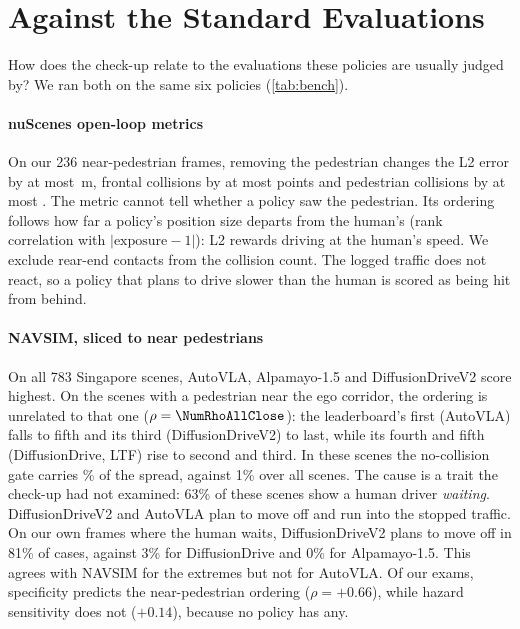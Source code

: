 \section{Against the Standard Evaluations}
\label{sec:bench}



How does the check-up relate to the evaluations these policies are usually judged by? We ran both on
the same six policies (\cref{tab:bench}).

\paragraph{nuScenes open-loop metrics}
On our 236 near-pedestrian frames, removing the pedestrian changes the L2 error by at most
\NumMaxdLtwo\,m, frontal collisions by at most \NumMaxdCol{} points and pedestrian collisions by at
most \NumMaxdPed. The metric cannot tell whether a policy saw the pedestrian. Its ordering follows how
far a policy's position size departs from the human's (rank correlation \NumRhoLtwoExp{} with
$|\text{exposure}-1|$): L2 rewards driving at the human's speed. We exclude rear-end contacts from the
collision count. The logged traffic does not react, so a policy that plans to drive slower than the
human is scored as being hit from behind.

\paragraph{NAVSIM, sliced to near pedestrians}
On all 783 Singapore scenes, AutoVLA, Alpamayo-1.5 and DiffusionDriveV2 score highest. On the
\NumNclose{} scenes with a pedestrian near the ego corridor, the ordering is unrelated to that one
($\rho=\NumRhoAllClose$): the leaderboard's first (AutoVLA) falls to fifth and its third
(DiffusionDriveV2) to last, while its fourth and fifth (DiffusionDrive, LTF) rise to second and third.
In these scenes the no-collision gate carries \NumNCshareClose\% of the spread, against 1\% over all
scenes. The cause is a trait the check-up had not examined: 63\% of these
scenes show a human driver \emph{waiting}. DiffusionDriveV2 and AutoVLA plan to move off and run into
the stopped traffic. On our own frames where the human waits, DiffusionDriveV2 plans to move off in
81\% of cases, against 3\% for DiffusionDrive and 0\% for Alpamayo-1.5. This agrees with NAVSIM for the
extremes but not for AutoVLA. Of our exams, specificity predicts the near-pedestrian ordering
($\rho=+0.66$), while hazard sensitivity does not ($+0.14$), because no policy has any.

